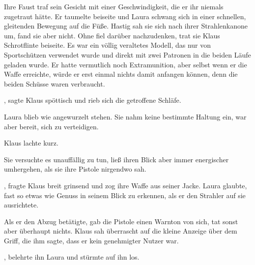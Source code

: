 \par

Ihre Faust traf sein Gesicht mit einer Geschwindigkeit, die er ihr niemals zugetraut hätte. Er taumelte beiseite und Laura schwang sich in einer schnellen, gleitenden Bewegung auf die Füße. Hastig sah sie sich nach ihrer Strahlenkanone um, fand sie aber nicht. Ohne fiel darüber nachzudenken, trat sie Klaus Schrotflinte beiseite. Es war ein völlig veraltetes Modell, das nur von Sportschützen verwendet wurde und direkt mit zwei Patronen in die beiden Läufe geladen wurde. Er hatte vermutlich noch Extramunition, aber selbst wenn er die Waffe erreichte, würde er erst einmal nichts damit anfangen können, denn die beiden Schüsse waren verbraucht.

\par

, sagte Klaus spöttisch und rieb sich die getroffene Schläfe. 

\par

Laura blieb wie angewurzelt stehen. Sie nahm keine bestimmte Haltung ein, war aber bereit, sich zu verteidigen. 

\par

Klaus lachte kurz. 

\par

Sie versuchte es unauffällig zu tun, ließ ihren Blick aber immer energischer umhergehen, als sie ihre Pistole nirgendwo sah.

\par

, fragte Klaus breit grinsend und zog ihre Waffe aus seiner Jacke.  Laura glaubte, fast so etwas wie Genuss in seinem Blick zu erkennen, als er den Strahler auf sie ausrichtete. 

\par

Als er den Abzug betätigte, gab die Pistole einen Warnton von sich, tat sonst aber überhaupt nichts. Klaus sah überrascht auf die kleine Anzeige über dem Griff, die ihm sagte, dass er kein genehmigter Nutzer war.

\par

, belehrte ihn Laura und stürmte auf ihn los.
